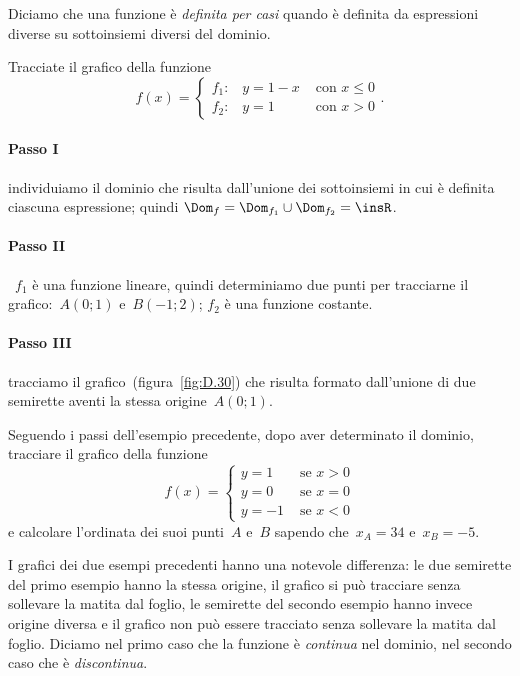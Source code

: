 \begin{definizione}
Diciamo che una funzione è \emph{definita per casi} quando è definita da espressioni diverse su sottoinsiemi diversi del dominio.
\end{definizione}
\begin{exrig}
 \begin{esempio}
 \label{ex:D.28}
Tracciate il grafico della funzione
\[
f(x)=\begin{cases}
f_{1}\text{:}\quad y=1-x & \text{ con }x\le 0\\
f_{2}\text{:}\quad y=1 & \text{ con }x>0
\end{cases}.
\]

\paragraph{Passo I} individuiamo il dominio che risulta dall'unione dei sottoinsiemi in cui è definita ciascuna espressione; quindi
$\Dom_{f}=\Dom_{f_1}\cup \Dom_{f_2}=\insR$.

\paragraph{Passo II} ~$f_1$ è una funzione lineare, quindi determiniamo due punti per tracciarne il grafico:~$A(0;1)$ e~$B(-1;2)$;
$f_2$ è una funzione costante.

\paragraph{Passo III} tracciamo il grafico~(figura~\ref{fig:D.30}) che risulta formato dall'unione di due semirette aventi la stessa origine~$A(0;1)$.

 \end{esempio}

 \begin{esempio}
Seguendo i passi dell'esempio precedente, dopo aver determinato il dominio, tracciare il grafico della funzione
\[
f(x)=\begin{cases}
y=1 & \text{ se }x>0\\
y=0 & \text{ se }x=0\\
y=-1 & \text{ se }x<0
\end{cases}
\]
e calcolare l'ordinata dei suoi punti~$A$ e~$B$ sapendo che~$x_{A}=34$ e~$x_{B}=-5$.
 \end{esempio}
\end{exrig}

\osservazione I grafici dei due esempi precedenti hanno una notevole differenza:
le due semirette del primo esempio hanno la stessa origine, il grafico si può tracciare senza sollevare la matita dal foglio,
le semirette del secondo esempio hanno invece origine diversa e il grafico non può essere tracciato senza sollevare la matita dal foglio.
Diciamo nel primo caso che la funzione è \emph{continua} nel dominio, nel secondo caso che è \emph{discontinua}.

